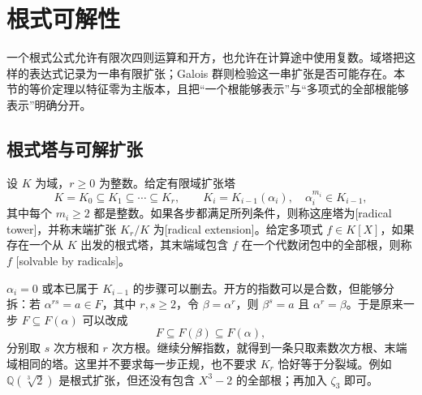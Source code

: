 
\section{根式可解性}
\label{b1:sec:2102}

一个根式公式允许有限次四则运算和开方，也允许在计算途中使用复数。域塔把这样的表达式记录为一串有限扩张；Galois 群则检验这一串扩张是否可能存在。本节的等价定理以特征零为主版本，且把“一个根能够表示”与“多项式的全部根能够表示”明确分开。

%
%

\subsection{根式塔与可解扩张}
\label{b1:subsec:2102:01}

\begin{definition}\label{b1:def:radical-extension}
	设 \(K\) 为域，\(r\geq0\) 为整数。给定有限域扩张塔
	\[
		K=K_0\subseteq K_1\subseteq\cdots\subseteq K_r, \qquad K_i=K_{i-1}(\alpha_i),\quad\alpha_i^{m_i}\in K_{i-1},
	\]
	其中每个 \(m_i\geq2\) 都是整数。如果各步都满足所列条件，则称这座塔为[radical tower]，并称末端扩张 \(K_r/K\) 为[radical extension]。给定多项式 \(f\in K[X]\)，如果存在一个从 \(K\) 出发的根式塔，其末端域包含 \(f\) 在一个代数闭包中的全部根，则称 \(f\) [solvable by radicals]。
\end{definition}

\(\alpha_i=0\) 或本已属于 \(K_{i-1}\) 的步骤可以删去。开方的指数可以是合数，但能够分拆：若 \(\alpha^{rs}=a\in F\)，其中 \(r,s\geq2\)，令 \(\beta=\alpha^r\)，则 \(\beta^s=a\) 且 \(\alpha^r=\beta\)。于是原来一步 \(F\subseteq F(\alpha)\) 可以改成
\[
	F\subseteq F(\beta)\subseteq F(\alpha),
\]
分别取 \(s\) 次方根和 \(r\) 次方根。继续分解指数，就得到一条只取素数次方根、末端域相同的塔。这里并不要求每一步正规，也不要求 \(K_r\) 恰好等于分裂域。例如 \(\mathbb Q(\sqrt[3]{2})\) 是根式扩张，但还没有包含 \(X^3-2\) 的全部根；再加入 \(\zeta_3\) 即可。

